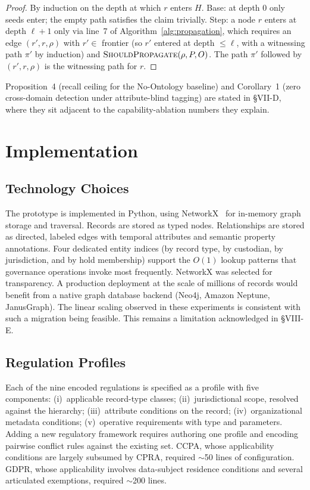 \documentclass{ieeeaccess}
\begin{document}
\begin{proof}
By induction on the depth at which $r$ enters $H$. Base: at depth 0 only seeds enter; the empty path satisfies the claim trivially. Step: a node $r$ enters at depth $\ell + 1$ only via line~7 of Algorithm~\ref{alg:propagation}, which requires an edge $(r', r, \rho)$ with $r' \in$ frontier (so $r'$ entered at depth $\leq \ell$, with a witnessing path $\pi'$ by induction) and $\textsc{ShouldPropagate}(\rho, P, O)$. The path $\pi'$ followed by $(r', r, \rho)$ is the witnessing path for $r$.
\end{proof}

Proposition~4 (recall ceiling for the No-Ontology baseline) and Corollary~1 (zero cross-domain detection under attribute-blind tagging) are stated in §VII-D, where they sit adjacent to the capability-ablation numbers they explain.

\section{Implementation}

\subsection{Technology Choices}

The prototype is implemented in Python, using NetworkX~\cite{networkx} for in-memory graph storage and traversal. Records are stored as typed nodes. Relationships are stored as directed, labeled edges with temporal attributes and semantic property annotations. Four dedicated entity indices (by record type, by custodian, by jurisdiction, and by hold membership) support the $O(1)$ lookup patterns that governance operations invoke most frequently. NetworkX was selected for transparency. A production deployment at the scale of millions of records would benefit from a native graph database backend (Neo4j, Amazon Neptune, JanusGraph). The linear scaling observed in these experiments is consistent with such a migration being feasible. This remains a limitation acknowledged in §VIII-E.

\subsection{Regulation Profiles}

Each of the nine encoded regulations is specified as a profile with five components: (i)~applicable record-type classes; (ii)~jurisdictional scope, resolved against the hierarchy; (iii)~attribute conditions on the record; (iv)~organizational metadata conditions; (v)~operative requirements with type and parameters. Adding a new regulatory framework requires authoring one profile and encoding pairwise conflict rules against the existing set. CCPA, whose applicability conditions are largely subsumed by CPRA, required $\sim$50 lines of configuration. GDPR, whose applicability involves data-subject residence conditions and several articulated exemptions, required $\sim$200 lines.
\end{document}
